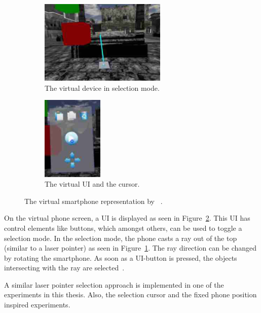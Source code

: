 \begin{figure}[H]
	\centering
	\begin{subfigure}[t]{0.45\textwidth}%
		\centering%
		\includegraphics[height=4cm]{figures/related_work/steed_2013_laser_pointer.png}
		\caption{The virtual device in selection mode.}\label{fig:steed-2013-laser-pointer}%
	\end{subfigure}%
	\hspace{0.1\textwidth}%
	\begin{subfigure}[t]{0.45\textwidth}%
		\centering%
		\includegraphics[height=4cm]{figures/related_work/steed_2013_ui.png}
		\caption{The virtual \gls{UI} and the cursor.}\label{fig:steed-2013-ui}
	\end{subfigure}%
	\caption[Virtual smartphone representation by Steep et al.]{The virtual smartphone representation by \citeauthor{Steed.2013}~\protect\cite[43]{Steed.2013}.}\label{fig:steed-2013}
\end{figure}

On the virtual phone screen, a \gls{UI} is displayed as seen in Figure~\ref{fig:steed-2013-ui}. This \gls{UI} has control elements like buttons, which amongst others, can be used to toggle a selection mode. In the selection mode, the phone casts a ray out of the top (similar to a laser pointer) as seen in Figure~\ref{fig:steed-2013-laser-pointer}. The ray direction can be changed by rotating the smartphone. As soon as a \gls{UI}-button is pressed, the objects intersecting with the ray are selected~\cite{Steed.2013}.

A similar laser pointer selection approach is implemented in one of the experiments in this thesis. Also, the selection cursor and the fixed phone position inspired experiments.

